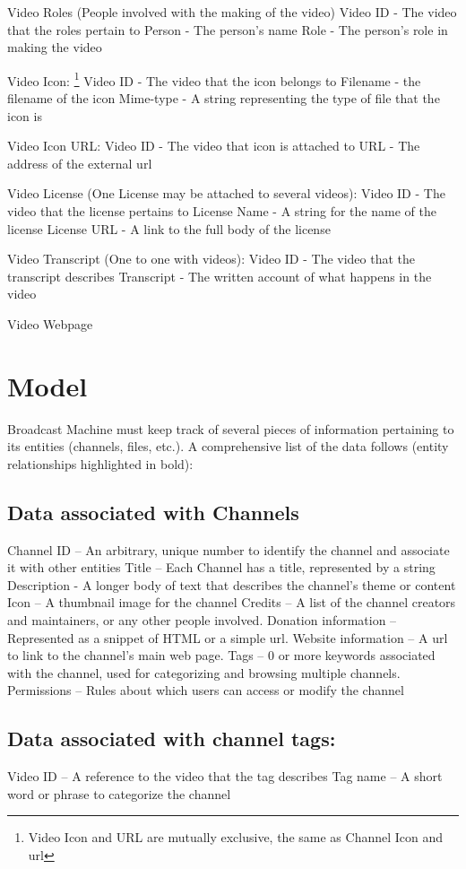 \documentclass[a4paper,12pt]{report}
\begin{document}
Video Roles (People involved with the making of the video)
	Video ID - The video that the roles pertain to
	Person - The person's name
	Role - The person's role in making the video

Video Icon:
\footnote{Video Icon and URL are mutually exclusive, the same as Channel Icon and url}
	Video ID - The video that the icon belongs to
	Filename - the filename of the icon
	Mime-type - A string representing the type of file that the icon is

Video Icon URL:
	Video ID - The video that icon is attached to
	URL - The address of the external url

Video License (One License may be attached to several videos):
	Video ID - The video that the license pertains to
	License Name - A string for the name of the license
	License URL - A link to the full body of the license

Video Transcript (One to one with videos):
	Video ID - The video that the transcript describes
	Transcript - The written account of what happens in the video

Video Webpage
	

\section{Model}
Broadcast Machine must keep track of  several pieces of information pertaining to its entities (channels, files, etc.). 
A comprehensive list of the data follows (entity relationships highlighted in bold):

\subsection{Data associated with Channels}
Channel ID – An arbitrary, unique number to identify the channel and  associate it with other entities
Title – Each Channel has a title, represented by a string
Description - A longer body of text that describes the channel's theme or content
Icon – A thumbnail image for the channel
Credits – A list of the channel creators and maintainers, or any other people involved. 
Donation information – Represented as a snippet of HTML or a simple url.
Website information – A url to link to the channel's main web page.
Tags – 0 or more keywords associated with the channel, used for categorizing and browsing multiple channels.
Permissions – Rules about which users can access or modify the channel

\subsection{Data associated with channel tags:}
Video ID – A reference to the video that the tag describes
Tag name – A short word or phrase to categorize the channel
\end{document}
